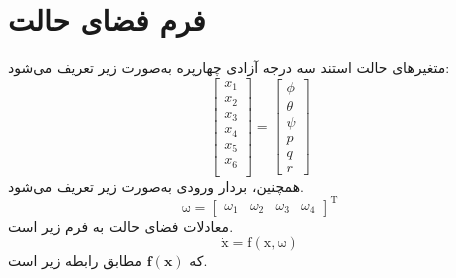 \section{فرم فضای حالت}\label{spacestate}
متغیرهای حالت استند سه درجه آزادی چهارپره به‌صورت زیر تعریف می‌شود:
\begin{equation}
	\begin{bmatrix}
		x_1\\x_2\\x_3\\x_4\\x_5\\x_6\\
	\end{bmatrix} = 
\begin{bmatrix}
	\phi\\ \theta \\ \psi \\ p\\ q\\ r
\end{bmatrix}
\end{equation}
همچنین، بردار ورودی به‌صورت زیر تعریف می‌شود.
\begin{equation}
	\boldsymbol{\mathrm{\omega}} = \begin{bmatrix}
		\omega_1&\omega_2&\omega_3&\omega_4
	\end{bmatrix}^\mathrm{T}
\end{equation}
معادلات فضای حالت به فرم زیر است.
\begin{equation}
	\boldsymbol{\dot{\mathrm{x}}} = \boldsymbol{\mathrm{f}}(\boldsymbol{\mathrm{x}}, \boldsymbol{\mathrm{\omega}})
\end{equation}
که $\boldsymbol f(\boldsymbol x)$ مطابق رابطه زیر است.
